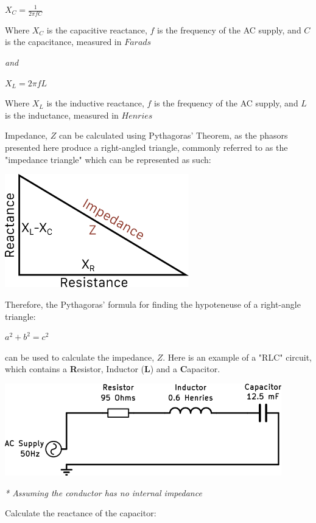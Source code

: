 \documentclass[11pt,a4paper]{article}
\begin{document}
$X_C = \frac{1}{2\pi fC}$

Where $X_C$ is the capacitive reactance, $f$ is the frequency of the AC supply, and $C$ is the capacitance, measured in $Farads$

\textit{and}

$X_L = 2\pi fL$

Where $X_L$ is the inductive reactance, $f$ is the frequency of the AC supply, and $L$ is the inductance, measured in $Henries$

Impedance, $Z$ can be calculated using Pythagoras' Theorem, as the phasors presented here produce a right-angled triangle, commonly referred to as the "impedance triangle" which can be represented as such:

\begin{center}
\includegraphics[width=8cm]{Impedance.png}
\end{center}

Therefore, the Pythagoras' formula for finding the hypoteneuse of a right-angle triangle:

$a^2 + b^2 = c^2$

can be used to calculate the impedance, $Z$. Here is an example of a "RLC" circuit, which contains a \textbf{R}esistor, Inductor (\textbf{L}) and a \textbf{C}apacitor.

\begin{center}
\includegraphics[width=12cm]{RLC.png}\par
\textit{* Assuming the conductor has no internal impedance}
\end{center}
Calculate the reactance of the capacitor:
\end{document}

